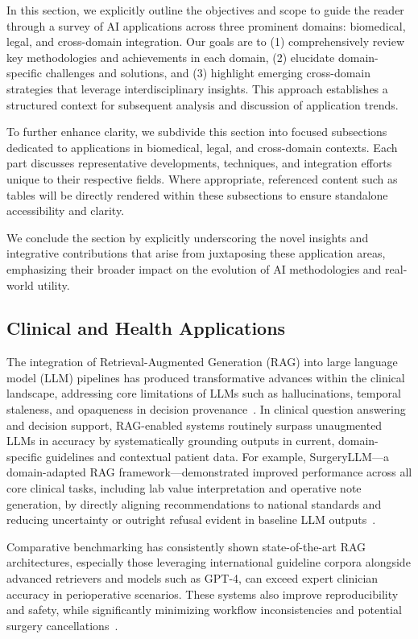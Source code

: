 \documentclass[sigconf]{acmart}
\begin{document}
In this section, we explicitly outline the objectives and scope to guide the reader through a survey of AI applications across three prominent domains: biomedical, legal, and cross-domain integration. Our goals are to (1) comprehensively review key methodologies and achievements in each domain, (2) elucidate domain-specific challenges and solutions, and (3) highlight emerging cross-domain strategies that leverage interdisciplinary insights. This approach establishes a structured context for subsequent analysis and discussion of application trends.

To further enhance clarity, we subdivide this section into focused subsections dedicated to applications in biomedical, legal, and cross-domain contexts. Each part discusses representative developments, techniques, and integration efforts unique to their respective fields. Where appropriate, referenced content such as tables will be directly rendered within these subsections to ensure standalone accessibility and clarity.

We conclude the section by explicitly underscoring the novel insights and integrative contributions that arise from juxtaposing these application areas, emphasizing their broader impact on the evolution of AI methodologies and real-world utility.

\subsection{Clinical and Health Applications}

The integration of Retrieval-Augmented Generation (RAG) into large language model (LLM) pipelines has produced transformative advances within the clinical landscape, addressing core limitations of LLMs such as hallucinations, temporal staleness, and opaqueness in decision provenance~\cite{ref1, ref2, ref3, ref5, ref6, ref7, ref8, ref29, ref30, ref31, ref42, ref48, ref52, ref53, ref54, ref55}. In clinical question answering and decision support, RAG-enabled systems routinely surpass unaugmented LLMs in accuracy by systematically grounding outputs in current, domain-specific guidelines and contextual patient data. For example, SurgeryLLM—a domain-adapted RAG framework—demonstrated improved performance across all core clinical tasks, including lab value interpretation and operative note generation, by directly aligning recommendations to national standards and reducing uncertainty or outright refusal evident in baseline LLM outputs~\cite{ref1}.

Comparative benchmarking has consistently shown state-of-the-art RAG architectures, especially those leveraging international guideline corpora alongside advanced retrievers and models such as GPT-4, can exceed expert clinician accuracy in perioperative scenarios. These systems also improve reproducibility and safety, while significantly minimizing workflow inconsistencies and potential surgery cancellations~\cite{ref2}.
\end{document}
